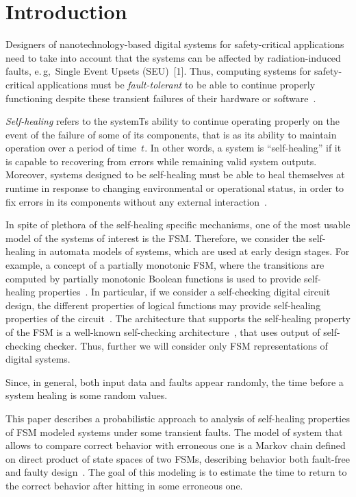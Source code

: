       \begin{multicols}{2}

      \label{st\stat}



\section{Introduction}

Designers of nanotechnology-based digital systems
for safety-critical applications need to take into
account that the systems can be affected by radiation-induced
faults, e.\,g,\ Single Event Upsets
(SEU)~[1].
Thus, computing systems for safety-critical
applications must be \textit{fault-tolerant} to be able to
continue properly functioning despite these transient
failures of their hardware or software~\cite{2fr, 3fr, 9fr}.

{\it Self-healing} refers to the systemТs ability to continue
operating properly on the event of the failure of some of its
components, that is as its ability to maintain operation over a
period of time~$t$. In other words, a system is ``self-healing'' if
it is capable to recovering from errors while remaining valid
system outputs. Moreover, systems designed to be self-healing must be
able to heal themselves at runtime in response to changing
environmental or operational status, in order to fix errors
in its components without any external interaction~\cite{4fr}.

In spite of plethora of the self-healing specific mechanisms, one
of the most usable model of the systems of interest is the FSM.
Therefore, we consider the self-healing in automata models of
systems, which are used at early design stages. For example, a concept of
a partially monotonic FSM, where the transitions are computed by
partially monotonic Boolean functions is used to provide
self-healing properties~\cite{6fr}. In particular, if we consider a
self-checking digital circuit design, the different properties of
logical functions may provide self-healing properties of the
circuit~\cite{6fr}. The architecture that supports the self-healing
property of the FSM is a well-known self-checking architecture~\cite{6fr}, that uses output of self-checking checker.
Thus, further we will consider only FSM representations of digital
systems.

Since, in general, both input data and faults appear
randomly, the time before a system healing is some
random values.

This paper describes a probabilistic approach to
analysis of self-healing properties of FSM modeled
systems under some transient faults.
The model of system that allows to compare correct
behavior with erroneous one is a Markov chain
defined on direct product of state spaces of two FSMs,
describing behavior both fault-free and faulty
design~\cite{7fr, 8fr}.
The goal of this modeling is to estimate the time
to return to the correct behavior after hitting in
some erroneous one.


\end{multicols}
